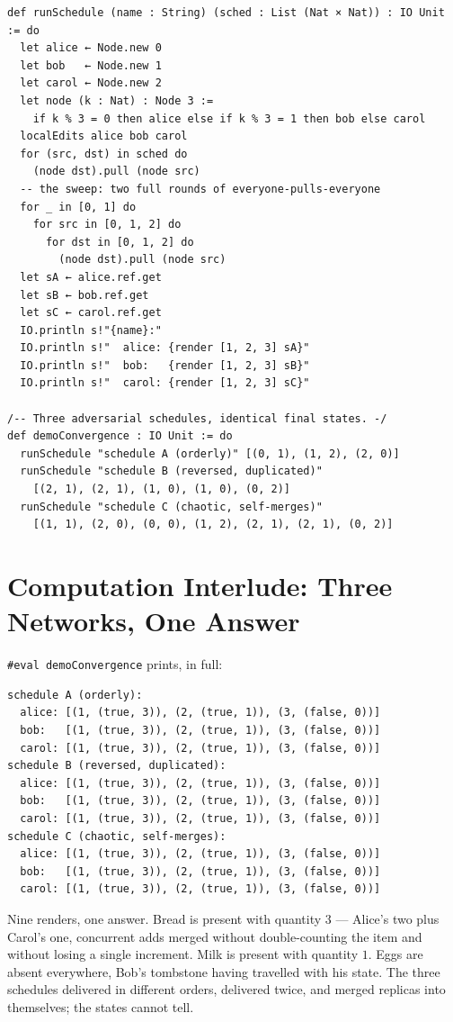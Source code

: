 \documentclass[12pt, a4paper, openright]{book}
\theoremstyle{thmstyle}
\theoremstyle{defstyle}
\begin{document}
\begin{verbatim}
def runSchedule (name : String) (sched : List (Nat × Nat)) : IO Unit := do
  let alice ← Node.new 0
  let bob   ← Node.new 1
  let carol ← Node.new 2
  let node (k : Nat) : Node 3 :=
    if k % 3 = 0 then alice else if k % 3 = 1 then bob else carol
  localEdits alice bob carol
  for (src, dst) in sched do
    (node dst).pull (node src)
  -- the sweep: two full rounds of everyone-pulls-everyone
  for _ in [0, 1] do
    for src in [0, 1, 2] do
      for dst in [0, 1, 2] do
        (node dst).pull (node src)
  let sA ← alice.ref.get
  let sB ← bob.ref.get
  let sC ← carol.ref.get
  IO.println s!"{name}:"
  IO.println s!"  alice: {render [1, 2, 3] sA}"
  IO.println s!"  bob:   {render [1, 2, 3] sB}"
  IO.println s!"  carol: {render [1, 2, 3] sC}"

/-- Three adversarial schedules, identical final states. -/
def demoConvergence : IO Unit := do
  runSchedule "schedule A (orderly)" [(0, 1), (1, 2), (2, 0)]
  runSchedule "schedule B (reversed, duplicated)"
    [(2, 1), (2, 1), (1, 0), (1, 0), (0, 2)]
  runSchedule "schedule C (chaotic, self-merges)"
    [(1, 1), (2, 0), (0, 0), (1, 2), (2, 1), (2, 1), (0, 2)]
\end{verbatim}

\section{Computation Interlude: Three Networks, One Answer}

\texttt{\#eval demoConvergence} prints, in full:

\begin{verbatim}
schedule A (orderly):
  alice: [(1, (true, 3)), (2, (true, 1)), (3, (false, 0))]
  bob:   [(1, (true, 3)), (2, (true, 1)), (3, (false, 0))]
  carol: [(1, (true, 3)), (2, (true, 1)), (3, (false, 0))]
schedule B (reversed, duplicated):
  alice: [(1, (true, 3)), (2, (true, 1)), (3, (false, 0))]
  bob:   [(1, (true, 3)), (2, (true, 1)), (3, (false, 0))]
  carol: [(1, (true, 3)), (2, (true, 1)), (3, (false, 0))]
schedule C (chaotic, self-merges):
  alice: [(1, (true, 3)), (2, (true, 1)), (3, (false, 0))]
  bob:   [(1, (true, 3)), (2, (true, 1)), (3, (false, 0))]
  carol: [(1, (true, 3)), (2, (true, 1)), (3, (false, 0))]
\end{verbatim}

Nine renders, one answer. Bread is present with quantity $3$ --- Alice's
two plus Carol's one, concurrent adds merged without double-counting the
item and without losing a single increment. Milk is present with
quantity $1$. Eggs are absent everywhere, Bob's tombstone having
travelled with his state. The three schedules delivered in different
orders, delivered twice, and merged replicas into themselves; the states
cannot tell.
\end{document}
